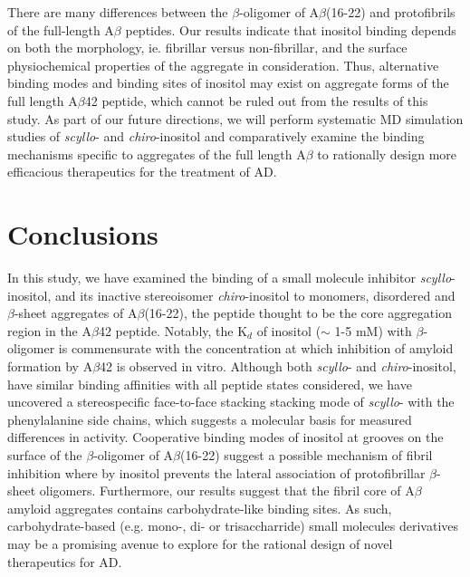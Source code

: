There are many differences between the $\beta$-oligomer of A$\beta$(16-22) and protofibrils of  the full-length A$\beta$ peptides. Our results indicate that inositol binding depends on both the morphology, ie. fibrillar versus non-fibrillar, and the surface physiochemical properties of the aggregate in consideration. Thus, alternative binding modes and binding sites of inositol may exist on aggregate forms of the full length A$\beta$42 peptide, which cannot be ruled out from the results of this study. As part of our future directions, we will perform systematic MD simulation studies of \emph{scyllo}- and \emph{chiro}-inositol and comparatively examine the binding mechanisms specific to aggregates of the full length A$\beta$ to rationally design more efficacious therapeutics for the treatment of AD.


\section{Conclusions} %
\label{sec:conclusions}

In this study, we have examined the binding of a small molecule inhibitor \emph{scyllo}-inositol, and its inactive stereoisomer \emph{chiro}-inositol to monomers, disordered and $\beta$-sheet aggregates of A$\beta$(16-22), the peptide thought to be the core aggregation region in the A$\beta$42 peptide. Notably, the K$_{d}$ of inositol ($\sim$ 1-5 mM) with $\beta$-oligomer is commensurate with the concentration at which inhibition of amyloid formation by A$\beta$42 is observed in vitro. Although both \emph{scyllo}- and \emph{chiro}-inositol, have similar binding affinities with all peptide states considered, we have uncovered a stereospecific face-to-face stacking stacking mode of \emph{scyllo}- with the phenylalanine side chains, which suggests a molecular basis for measured differences in activity.  Cooperative binding modes of inositol at grooves on the surface of the $\beta$-oligomer of A$\beta$(16-22) suggest a possible mechanism of fibril inhibition where by inositol prevents the lateral association of protofibrillar $\beta$-sheet oligomers. Furthermore, our results suggest that the fibril core of A$\beta$ amyloid aggregates contains carbohydrate-like binding sites. As such, carbohydrate-based (e.g. mono-, di- or trisaccharride) small molecules derivatives may be a promising avenue to explore for the rational design of novel therapeutics for AD.

